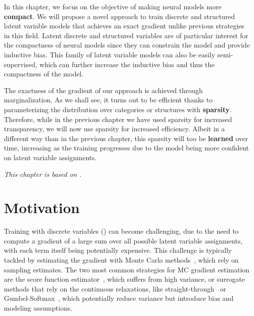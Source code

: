 \label{chap:sparsemarg}

\cleardoublepage
\doublespacing

\noindent In this chapter, we focus on the objective of making neural models
more \textbf{compact}. We will propose a novel approach to train
discrete and structured latent variable models that achieves an exact
gradient unlike previous strategies in this field. Latent discrete
and structured variables are of particular interest for the compactness
of neural models since they can constrain the model and provide
inductive bias. This family of latent variable models can also be easily
semi-supervised, which can further increase the inductive bias and
thus the compactness of the model.

The exactness of the gradient of our approach is achieved through
marginalization. As we shall see, it turns out to be efficient thanks
to parameterizing the distribution over categories or structures with
\textbf{sparsity}. Therefore, while in the previous chapter we have
used sparsity for increased transparency, we will now use sparsity
for increased efficiency. Albeit in a different way than in the
previous chapter, this sparsity will too be \textbf{learned} over
time, increasing as the training progresses due to the model being
more confident on latent variable assignments.

\textit{This chapter is based on \citet*{correia2020procneurips}.}

\section{Motivation}
\label{sec:intro}

\noindent Training with discrete variables () can
become challenging, due to the need to compute a gradient of a large
sum over all possible latent variable assignments, with each term
itself being potentially expensive. This challenge is typically
tackled by estimating the gradient with Monte Carlo
methods~\citep[MC;][]{mohamed2019monte}, which rely on sampling
estimates. The two most common strategies for MC gradient estimation
are the score function
estimator~\citep[SFE;][]{rubinstein1976monte,paisley2012variational},
which suffers from high variance, or surrogate methods that rely on
the continuous relaxations, like straight-through~\citep{STE} or
Gumbel-Softmax~\citep{Concrete,GumbelSoftmax}, which potentially
reduce variance but introduce bias and modeling assumptions.

